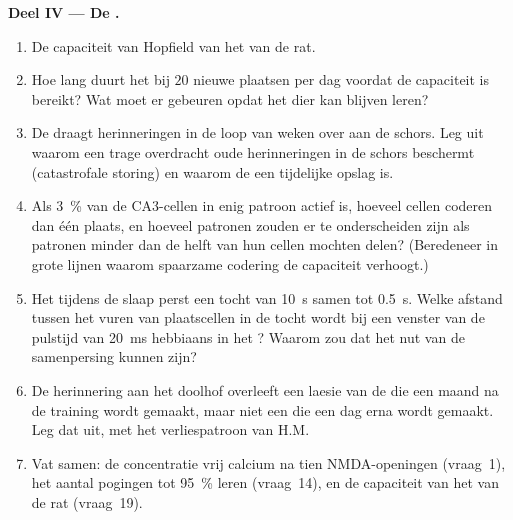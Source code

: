 \begin{problem}
\medskip
\noindent\textbf{Deel IV --- De .}
\begin{enumerate}[resume]
  \item De capaciteit van Hopfield van het  van de rat.
  \item Hoe lang duurt het bij $20$ nieuwe plaatsen per dag voordat de
        capaciteit is bereikt? Wat moet er gebeuren opdat het dier kan
        blijven leren?
  \item De  draagt herinneringen in de loop van weken over
        aan de schors. Leg uit waarom een trage overdracht oude
        herinneringen in de schors beschermt (catastrofale storing) en
        waarom de  een tijdelijke opslag is.
  \item Als \qty{3}{\%} van de CA3-cellen in enig patroon actief is,
        hoeveel cellen coderen dan één plaats, en hoeveel patronen
        zouden er te onderscheiden zijn als patronen minder dan de
        helft van hun cellen mochten delen? (Beredeneer in grote lijnen
        waarom spaarzame codering de capaciteit verhoogt.)
  \item Het  tijdens de slaap perst een tocht van
        \qty{10}{s} samen tot \qty{0.5}{s}. Welke afstand tussen het
        vuren van plaatscellen in de tocht wordt bij een venster van de
        pulstijd van \qty{20}{ms} hebbiaans in het ? Waarom
        zou dat het nut van de samenpersing kunnen zijn?
  \item De herinnering aan het doolhof overleeft een laesie van de
         die een maand na de training wordt gemaakt, maar
        niet een die een dag erna wordt gemaakt. Leg dat uit, met het
        verliespatroon van H.M.
  \item Vat samen: de concentratie vrij calcium na tien NMDA-openingen
        (vraag~1), het aantal pogingen tot \qty{95}{\%} leren
        (vraag~14), en de capaciteit van het  van de rat (vraag~19).
\end{enumerate}
\end{problem}
